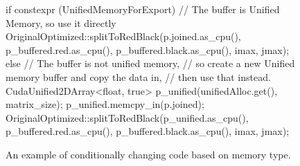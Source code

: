 \begin{figure}[ht]
    \centering
    \begin{cppcode}
if constexpr (UnifiedMemoryForExport) {
    // The buffer is Unified Memory, so use it directly
    OriginalOptimized::splitToRedBlack(p.joined.as_cpu(),
                                       p_buffered.red.as_cpu(),
                                       p_buffered.black.as_cpu(),
                                       imax, jmax);
} else {
    // The buffer is not unified memory, 
    // so create a new Unified memory buffer and copy the data in,
    // then use that instead.
    CudaUnified2DArray<float, true> p_unified(unifiedAlloc.get(), matrix_size);
    p_unified.memcpy_in(p.joined);
    OriginalOptimized::splitToRedBlack(p_unified.as_cpu(),
                                       p_buffered.red.as_cpu(),
                                       p_buffered.black.as_cpu(),
                                       imax, jmax);
}\end{cppcode}
    \caption{An example of conditionally changing code based on memory type.}
    \label{fig:TemplatedMemoryUsage}
\end{figure}